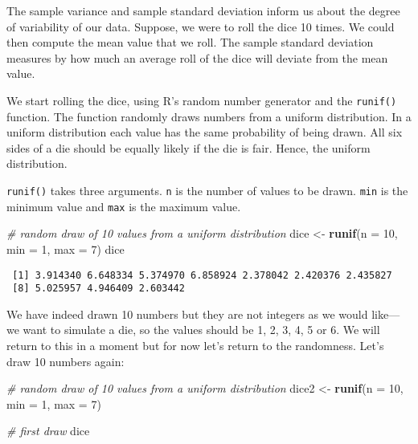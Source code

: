 \documentclass[]{article}
\newenvironment{Shaded}{\begin{snugshade}}{\end{snugshade}}
\newcommand{\CommentTok}[1]{\textcolor[rgb]{0.56,0.35,0.01}{\textit{#1}}}
\newcommand{\DataTypeTok}[1]{\textcolor[rgb]{0.13,0.29,0.53}{#1}}
\newcommand{\DecValTok}[1]{\textcolor[rgb]{0.00,0.00,0.81}{#1}}
\newcommand{\KeywordTok}[1]{\textcolor[rgb]{0.13,0.29,0.53}{\textbf{#1}}}
\newcommand{\NormalTok}[1]{#1}
\newcommand{\StringTok}[1]{\textcolor[rgb]{0.31,0.60,0.02}{#1}}
\begin{document}
The sample variance and sample standard deviation inform us about the degree of variability of our data. Suppose, we were to roll the dice 10 times. We could then compute the mean value that we roll. The sample standard deviation measures by how much an average roll of the dice will deviate from the mean value.

We start rolling the dice, using R's random number generator and the \texttt{runif()} function. The function randomly draws numbers from a uniform distribution. In a uniform distribution each value has the same probability of being drawn. All six sides of a die should be equally likely if the die is fair. Hence, the uniform distribution.

\texttt{runif()} takes three arguments. \texttt{n} is the number of values to be drawn. \texttt{min} is the minimum value and \texttt{max} is the maximum value.

\begin{Shaded}
\begin{Highlighting}[]
\CommentTok{# random draw of 10 values from a uniform distribution}
\NormalTok{dice <-}\StringTok{ }\KeywordTok{runif}\NormalTok{(}\DataTypeTok{n =} \DecValTok{10}\NormalTok{, }\DataTypeTok{min =} \DecValTok{1}\NormalTok{, }\DataTypeTok{max =} \DecValTok{7}\NormalTok{)}
\NormalTok{dice}
\end{Highlighting}
\end{Shaded}

\begin{verbatim}
 [1] 3.914340 6.648334 5.374970 6.858924 2.378042 2.420376 2.435827
 [8] 5.025957 4.946409 2.603442
\end{verbatim}

We have indeed drawn 10 numbers but they are not integers as we would like---we want to simulate a die, so the values should be 1, 2, 3, 4, 5 or 6. We will return to this in a moment but for now let's return to the randomness. Let's draw 10 numbers again:

\begin{Shaded}
\begin{Highlighting}[]
\CommentTok{# random draw of 10 values from a uniform distribution}
\NormalTok{dice2 <-}\StringTok{ }\KeywordTok{runif}\NormalTok{(}\DataTypeTok{n =} \DecValTok{10}\NormalTok{, }\DataTypeTok{min =} \DecValTok{1}\NormalTok{, }\DataTypeTok{max =} \DecValTok{7}\NormalTok{)}

\CommentTok{# first draw}
\NormalTok{dice}
\end{Highlighting}
\end{Shaded}
\end{document}
